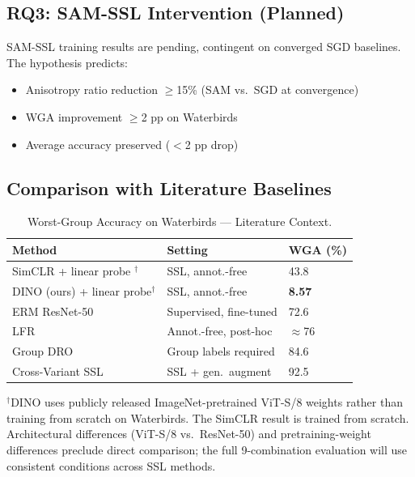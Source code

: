 \subsection{RQ3: SAM-SSL Intervention (Planned)}

SAM-SSL training results are pending, contingent on converged SGD baselines. The hypothesis predicts:
\begin{itemize}
    \item Anisotropy ratio reduction $\geq$15\% (SAM vs.\ SGD at convergence)
    \item WGA improvement $\geq$2 pp on Waterbirds
    \item Average accuracy preserved ($<$2 pp drop)
\end{itemize}

\subsection{Comparison with Literature Baselines}

\begin{table}[t]
\caption{Worst-Group Accuracy on Waterbirds --- Literature Context.}
\label{tab:literature}
\begin{center}
\begin{tabular}{lll}
\toprule
\textbf{Method} & \textbf{Setting} & \textbf{WGA (\%)} \\
\midrule
SimCLR + linear probe \citep{chen2025spectral}$^\dagger$ & SSL, annot.-free & 43.8 \\
DINO (ours) + linear probe$^\dagger$ & SSL, annot.-free & \textbf{8.57} \\
ERM ResNet-50 \citep{izmailov2022ssl} & Supervised, fine-tuned & 72.6 \\
LFR \citep{ghaznavi2023lfr} & Annot.-free, post-hoc & $\approx$76 \\
Group DRO \citep{sagawa2019dro} & Group labels required & 84.6 \\
Cross-Variant SSL \citep{yadav2026crossvariant} & SSL + gen.\ augment & 92.5 \\
\bottomrule
\end{tabular}
\end{center}
\end{table}

$^\dagger$DINO uses publicly released ImageNet-pretrained ViT-S/8 weights rather than training from scratch on Waterbirds. The SimCLR result \citep{chen2025spectral} is trained from scratch. Architectural differences (ViT-S/8 vs.\ ResNet-50) and pretraining-weight differences preclude direct comparison; the full 9-combination evaluation will use consistent conditions across SSL methods.

